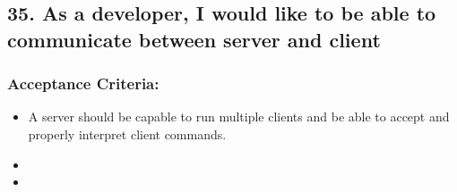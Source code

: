 \subsection*{35. As a developer, I would like to be able to communicate between server and client}


\subsubsection*{Acceptance Criteria:}

\begin{itemize}
\item A server should be capable to run multiple clients and be able to accept and properly interpret client commands.
\item 
\item 
\end{itemize}
